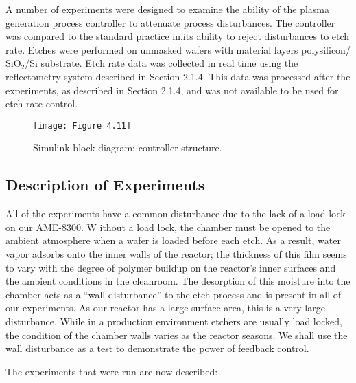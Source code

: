 \tab A number of experiments were designed to examine the ability of the plasma generation
process controller to attenuate process disturbances. The controller was compared to the
standard practice in.its ability to reject disturbances to etch rate. Etches were performed
on unmasked wafers with material layers polysilicon/$\text{SiO}_{2}$/Si substrate. Etch rate data was collected in real time using the reflectometry system described in Section 2.1.4. This data was processed after the experiments, as described in Section 2.1.4, and was not available to be used for etch rate control.

\begin{figure}[H]
	\centering
	\texttt{[image: Figure 4.11]}
	\bf\caption{ Simulink block diagram: controller structure.}
	\label{fig:4.11}
\end{figure}

\subsection{Description of Experiments}
\tab All of the experiments have a common disturbance due to the lack of a load lock on our
AME-8300. W ithout a load lock, the chamber must be opened to the ambient atmosphere
when a wafer is loaded before each etch. As a result, water vapor adsorbs onto the inner
walls of the reactor; the thickness of this film seems to vary with the degree of polymer
buildup on the reactor’s inner surfaces and the ambient conditions in the cleanroom. The
desorption of this moisture into the chamber acts as a “wall disturbance” to the etch process
and is present in all of our experiments. As our reactor has a large surface area, this is a
very large disturbance. While in a production environment etchers are usually load locked,
the condition of the chamber walls varies as the reactor seasons. We shall use the wall
disturbance as a test to demonstrate the power of feedback control.

The experiments that were run are now described:

